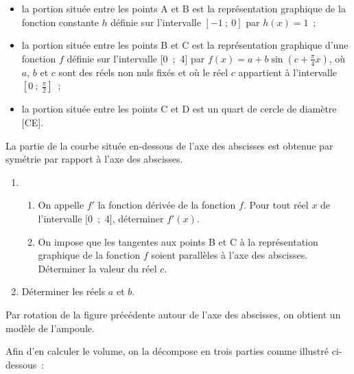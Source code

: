 \begin{indent}
     \begin{itemize}
          \item la portion située entre les points A et B est la représentation graphique de la fonction constante
          $h$ définie sur l'intervalle $[-1~;~0]$ par $h(x) = 1$~;
          \item la portion située entre les points B et C est la représentation graphique d'une fonction $f$ définie sur l'intervalle [0~;~4] par $f(x) = a + b \sin \left(c + \frac{\pi}{4} x\right)$, où $a$, $b$ et $c$ sont des réels non nuls
          fixés et où le réel $c$ appartient à l'intervalle $\left[0~;~\frac{\pi}{2}\right]$~;
          \item la portion située entre les points C et D est un quart de cercle de diamètre [CE].
     \end{itemize}
\end{indent}
La partie de la courbe située en-dessous de l'axe des abscisses est obtenue par symétrie par rapport à l'axe des abscisses.
\medbreak
\begin{enumerate}
     \item
     \begin{enumerate}[label=\alph*.]
          \item On appelle $f'$ la fonction dérivée de la fonction $f$. Pour tout réel $x$ de l'intervalle [0~;~4], déterminer $f'(x)$.
          \item On impose que les tangentes aux points B et C à la représentation graphique de la fonction $f$ soient parallèles à l'axe des abscisses. Déterminer la valeur du réel $c$.
     \end{enumerate}
     \item  Déterminer les réels $a$ et $b$.
\end{enumerate}
\bigbreak
{}
\medbreak
Par rotation de la figure précédente autour de l'axe des abscisses, on obtient un modèle de l'ampoule.
\par
Afin d'en calculer le volume, on la décompose en trois parties comme illustré ci-dessous~:
